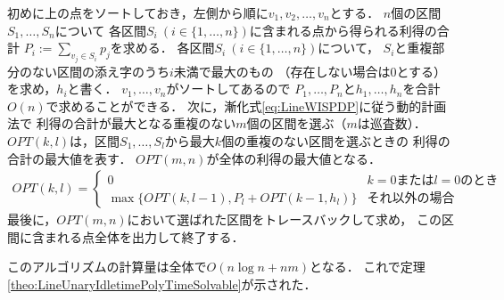 初めに{\graphLine}上の点をソートしておき，左側から順に$v_1, v_2, \ldots, v_n$とする．
$n$個の区間$S_1, \ldots, S_n$について
各区間$S_i\ (i \in \{ 1, \ldots, n \})$に含まれる点から得られる利得の合計
$P_i := \sum_{v_j \in S_i} p_j$を求める．
%
各区間$S_i\ (i \in \{ 1, \ldots, n \})$について，
$S_i$と重複部分のない区間の添え字のうち$i$未満で最大のもの
（存在しない場合は$0$とする）を求め，$h_i$と書く．
$v_1, \ldots, v_n$がソートしてあるので
$P_1, \ldots, P_n$と$h_1, \ldots, h_n$を合計$O(n)$で求めることができる．
%
次に，漸化式\eqref{eq:LineWISPDP}に従う動的計画法で
利得の合計が最大となる重複のない$m$個の区間を選ぶ（$m$は巡査数）．
$OPT(k, l)$は，区間$S_1, \ldots, S_l$から最大$k$個の重複のない区間を選ぶときの
利得の合計の最大値を表す．
$OPT(m, n)$が全体の利得の最大値となる．
\begin{align}
  \label{eq:LineWISPDP}
  OPT(k, l) = 
  \begin{cases}
    0 & \text{$k = 0$または$l = 0$のとき} \\
    \max \{
      OPT(k, l - 1), 
      P_l + OPT(k - 1, h_l)
    \}
    & \text{それ以外の場合}
  \end{cases}
\end{align}
最後に，$OPT(m, n)$において選ばれた区間をトレースバックして求め，
この区間に含まれる点全体を出力して終了する．

このアルゴリズムの計算量は全体で$O(n \log n + nm)$となる．
これで定理\ref{theo:LineUnaryIdletimePolyTimeSolvable}が示された．


